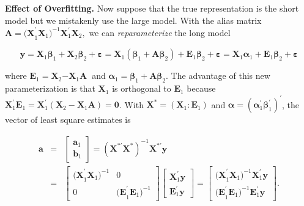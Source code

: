 \textbf{Effect of Overfitting.} Now suppose that the true representation is
the short model but we mistakenly use the large model. With the alias matrix
$\mathbf{A}=\mathbf{(X}_{1}^{\prime }\mathbf{X}_{1}%
\mathbf{)}^{-1}\mathbf{X}_{1}^{\prime }\mathbf{X}_{2},$ we can \textit{%
reparameterize} the long model
\begin{center}
\[
\mathbf{y}=\mathbf{X}_{1}\boldsymbol
\beta_{1}+\mathbf{X}_{2}\boldsymbol \beta_{2} + \boldsymbol
\varepsilon
=\mathbf{X}_{1}\left( \boldsymbol \beta_{1}+\mathbf{A \boldsymbol \beta }%
_{2}\right) +\mathbf{E}_{1}\boldsymbol \beta_{2} + \boldsymbol
\varepsilon = \mathbf{X}_{1}%
\boldsymbol \alpha_{1}+\mathbf{E}_{1}\boldsymbol \beta_{2} +
\boldsymbol \varepsilon
\]
\end{center}
where
$\mathbf{E}_{1}=\mathbf{X}_{2}\mathbf{-X}_{1}\mathbf{A}$\textbf{\
}and $\boldsymbol \alpha_{1}=\boldsymbol \beta_{1}+\mathbf{A
\boldsymbol \beta}_{2}$. The advantage of this new parameterization
is that $\mathbf{X}_{1}$ is
orthogonal to $\mathbf{E}_{1}$ because $\mathbf{X}_{1}^{\prime }\mathbf{E}%
_{1}=\mathbf{X}_{1}^{\prime }(\mathbf{X}_{2}-\mathbf{X}_{1}\mathbf{A})=%
\mathbf{0}$. With $\mathbf{X}^{\ast }=(\mathbf{X}%
_{1}: \mathbf{E}_{1})$ and $\boldsymbol \alpha =(\boldsymbol \alpha_{1}^{\prime }%
\boldsymbol \beta_{1}^{\prime })^{\prime }$, the vector of least
square estimates is
\begin{center}
\begin{eqnarray*}
\mathbf{a} &=&%
\begin{bmatrix}
\mathbf{a}_{1} \\
\mathbf{b}_{1}%
\end{bmatrix}%
=\left( \mathbf{X}^{\ast \prime }\mathbf{X}^{\ast }\right) ^{-1}\mathbf{X}%
^{\ast \prime }\mathbf{y} \\
&=&%
\begin{bmatrix}
\mathbf{(X}_{1}^{\prime }\mathbf{X}_{1}\mathbf{)}^{-1} & 0 \\
0 & \mathbf{(E}_{1}^{\prime }\mathbf{E}_{1}\mathbf{)}^{-1}%
\end{bmatrix}%
\begin{bmatrix}
\mathbf{X}_{1}^{\prime }\mathbf{y} \\
\mathbf{E}_{1}^{\prime }\mathbf{y}%
\end{bmatrix}%
=%
\begin{bmatrix}
\mathbf{(X}_{1}^{\prime }\mathbf{X}_{1}\mathbf{)}^{-1}\mathbf{X}_{1}^{\prime
}\mathbf{y} \\
\mathbf{(E}_{1}^{\prime }\mathbf{E}_{1}\mathbf{)}^{-1}\mathbf{E}_{1}^{\prime
}\mathbf{y}%
\end{bmatrix}%
.
\end{eqnarray*}
\end{center}

